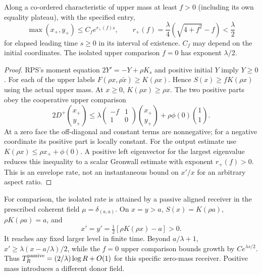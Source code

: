 \documentclass[11pt]{article}
\begin{document}
\begin{lemma}\label{an04goev1:ceiling}
Along a co-ordered characteristic of upper mass at least \(f>0\)
(including its own equality plateau), with the specified entry,
\[
 \max(x_+,y_+)\le C_f e^{r_+(f)s},\qquad
 r_+(f)=\frac{\lambda}{4}(\sqrt{4+f^2}-f)<\frac{\lambda}{2}
\]
for elapsed leading time \(s\ge0\) in its interval of existence.
\(C_f\) may depend on the initial coordinates. The isolated
upper comparison \(f=0\) has exponent \(\lambda/2\).
\end{lemma}
\begin{proof}
RPS's moment equation \(2Y'=-Y+\rho K_s\) and positive initial
\(Y\) imply \(Y\ge0\). For each of the upper labels
\(F(\rho x,\rho\tilde x)\ge K(\rho x)\). Hence
\(S(x)\ge fK(\rho x)\) using the actual upper mass.
At \(x\ge0\), \(K(\rho x)\ge\rho x\).
The two positive parts obey the cooperative upper comparison
\[
 2D^+\binom{x_+}{y_+}\le
 \lambda\begin{pmatrix}-f&1\\1&0\end{pmatrix}
          \binom{x_+}{y_+}+\rho\phi(0)\binom11 .
\]
At a zero face the off-diagonal and constant terms are nonnegative;
for a negative coordinate its positive part is locally constant.
For the output estimate use \(K(\rho x)\le\rho x_++\phi(0)\).
A positive left eigenvector for the largest eigenvalue reduces this
inequality to a scalar Gronwall estimate with exponent \(r_+(f)>0\).
This is an envelope rate, not an instantaneous bound on \(x'/x\)
for an arbitrary aspect ratio.
\end{proof}

For comparison, the isolated rate is attained by a passive aligned
receiver in the prescribed coherent field \(\mu=\delta_{(a,a)}\).
On \(x=y>a\), \(S(x)=K(\rho a)\), \(\rho K(\rho a)=a\), and
\[
  x'=y'=\tfrac12[\rho K(\rho x)-a]>0 .
\]
It reaches any fixed larger level in finite time. Beyond \(a/\lambda+1\),
\(x'\ge\lambda(x-a/\lambda)/2\), while the \(f=0\) upper comparison
bounds growth by \(C e^{\lambda s/2}\). Thus
\(T_R^{\rm passive}=(2/\lambda)\log R+O(1)\) for this specific
zero-mass receiver. Positive mass introduces a different donor field.
\end{document}
